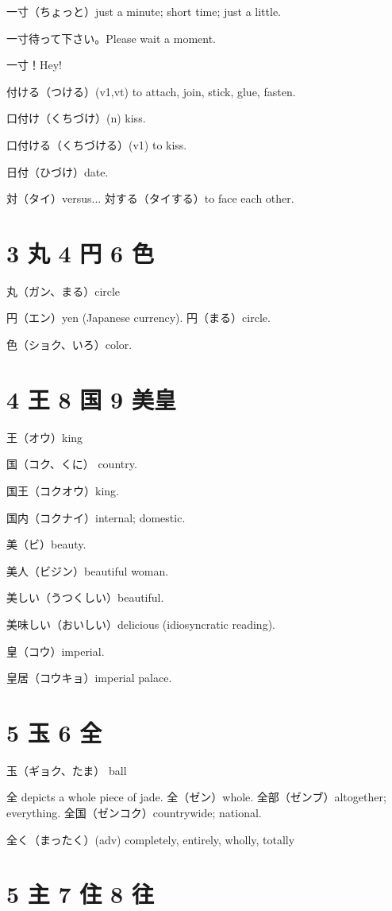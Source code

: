 一寸（ちょっと）just a minute; short time; just a little.

一寸待って下さい。Please wait a moment.

一寸！Hey!

付ける（つける）(v1,vt) to attach, join, stick, glue, fasten.

口付け（くちづけ）(n) kiss.

口付ける（くちづける）(v1) to kiss.

日付（ひづけ）date.

対（タイ）versus...
対する（タイする）to face each other.

\section{3 丸 4 円 6 色}

丸（ガン、まる）circle

円（エン）yen (Japanese currency).
円（まる）circle.

色（ショク、いろ）color.

\section{4 王 8 国 9 美皇}

王（オウ）king

国（コク、くに） country.

国王（コクオウ）king.

国内（コクナイ）internal; domestic.

美（ビ）beauty.

美人（ビジン）beautiful woman.

美しい（うつくしい）beautiful.

美味しい（おいしい）delicious (idiosyncratic reading).

皇（コウ）imperial.

皇居（コウキョ）imperial palace.

\section{5 玉 6 全}

玉（ギョク、たま） ball

全 depicts a whole piece of jade.
全（ゼン）whole.
全部（ゼンブ）altogether; everything.
全国（ゼンコク）countrywide; national.

全く（まったく）(adv) completely, entirely, wholly, totally

\section{5 主 7 住 8 往}


